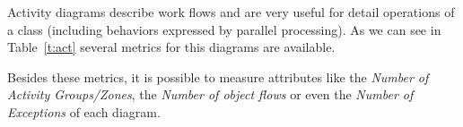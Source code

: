 Activity diagrams describe work flows and are very useful for detail operations of a class (including behaviors expressed by parallel processing).
As we can see in Table~\ref{t:act} several metrics for this diagrams are available.

Besides these metrics, it is possible to measure attributes like the \emph{Number of Activity Groups/Zones}, the \emph{Number of object flows} or even the \emph{Number of Exceptions} of each diagram. 
